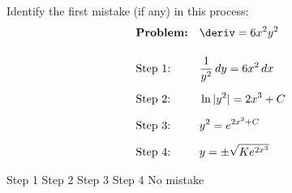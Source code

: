 \begin{questions}
    \question Identify the first mistake (if any) in this process: \begin{align*}
        & \textbf{Problem:} && \deriv = 6x^2y^2 \\[11pt]
        & \text{Step 1:} && \dfrac{1}{y^2} \, dy = 6x^2 \, dx \\[5.5pt]
        & \text{Step 2:} && \ln |y^2| = 2x^3 + C \\[5.5pt]
        & \text{Step 3:} && y^2 = e^{2x^3 + C} \\[5.5pt]
        & \text{Step 4:} && y = \pm\sqrt{Ke^{2x^3}}
    \end{align*}

    \begin{oneparchoices}
        \choice Step 1
        \choice Step 2
        \choice Step 3
        \choice Step 4
        \choice No mistake
    \end{oneparchoices} \par \horizontalline
\end{questions}
